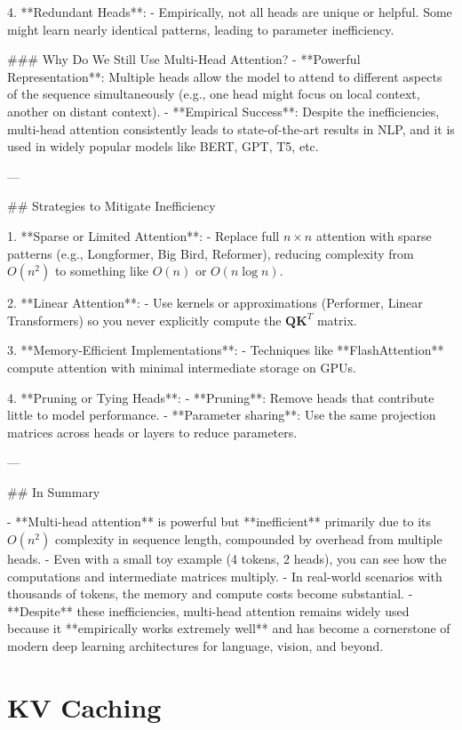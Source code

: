4. **Redundant Heads**:  
   - Empirically, not all heads are unique or helpful. Some might learn nearly identical patterns, leading to parameter inefficiency.  

### Why Do We Still Use Multi-Head Attention?
- **Powerful Representation**: Multiple heads allow the model to attend to different aspects of the sequence simultaneously (e.g., one head might focus on local context, another on distant context).  
- **Empirical Success**: Despite the inefficiencies, multi-head attention consistently leads to state-of-the-art results in NLP, and it is used in widely popular models like BERT, GPT, T5, etc.  

---

## Strategies to Mitigate Inefficiency

1. **Sparse or Limited Attention**:  
   - Replace full \(n \times n\) attention with sparse patterns (e.g., Longformer, Big Bird, Reformer), reducing complexity from \(O(n^2)\) to something like \(O(n)\) or \(O(n \log n)\).

2. **Linear Attention**:  
   - Use kernels or approximations (Performer, Linear Transformers) so you never explicitly compute the \(\mathbf{Q}\mathbf{K}^T\) matrix.

3. **Memory-Efficient Implementations**:  
   - Techniques like **FlashAttention** compute attention with minimal intermediate storage on GPUs.

4. **Pruning or Tying Heads**:  
   - **Pruning**: Remove heads that contribute little to model performance.  
   - **Parameter sharing**: Use the same projection matrices across heads or layers to reduce parameters.

---

## In Summary

- **Multi-head attention** is powerful but **inefficient** primarily due to its \(O(n^2)\) complexity in sequence length, compounded by overhead from multiple heads.  
- Even with a small toy example (4 tokens, 2 heads), you can see how the computations and intermediate matrices multiply.  
- In real-world scenarios with thousands of tokens, the memory and compute costs become substantial.  
- **Despite** these inefficiencies, multi-head attention remains widely used because it **empirically works extremely well** and has become a cornerstone of modern deep learning architectures for language, vision, and beyond.


\section{KV Caching}
\label{sec:transformer:kv_caching}

